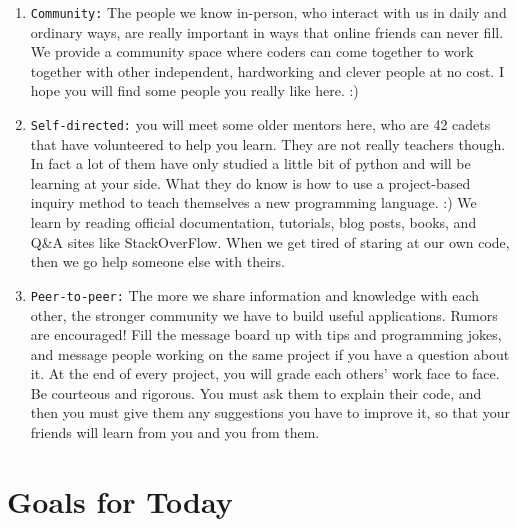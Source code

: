 \documentclass{42-en}
\begin{document}
\begin{enumerate}

\item \texttt{Community:} The people we know in-person, who interact with us in daily and ordinary ways, are really important in ways that online friends can never fill. We provide a community space where coders can come together to work together with other independent, hardworking and clever people at no cost. I hope you will find some people you really like here. :)

\item \texttt{Self-directed:} you will meet some older mentors here, who are 42 cadets that have volunteered to help you learn. They are not really teachers though. In fact a lot of them have only studied a little bit of python and will be learning at your side. What they do know is how to use a project-based inquiry method to teach themselves a new programming language. :) We learn by reading official documentation, tutorials, blog posts, books, and Q\&A sites like StackOverFlow. When we get tired of staring at our own code, then we go help someone else with theirs.

\item \texttt{Peer-to-peer:} The more we share information and knowledge with each other, the stronger community we have to build useful applications. Rumors are encouraged! Fill the message board up with tips and programming jokes, and message people working on the same project if you have a question about it. At the end of every project, you will grade each others' work face to face. Be courteous and rigorous. You must ask them to explain their code, and then you must give them any suggestions you have to improve it, so that your friends will learn from you and you from them.

\end{enumerate}

\startexercices


\chapter{Goals for Today}
\end{document}
